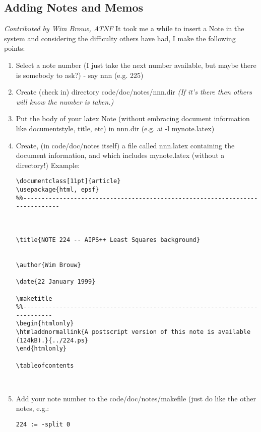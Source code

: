 \subsection{Adding Notes and Memos}\label{215:addnotes}
\textit{Contributed by Wim Brouw, ATNF}\newline
It took me a while to insert a Note in the system and considering the
difficulty others have had, I make the following points:

\begin{enumerate}
\item Select a note number (I just take the next number available, but maybe
   there is somebody to ask?) - say nnn (e.g. 225)
\item Create (check in) directory code/doc/notes/nnn.dir
\textit{(If it's there then others will know the number is taken.)}
\item Put the body of your latex Note (without embracing document information
   like documentstyle, title, \verb++ etc) in nnn.dir (e.g.
   ai -l mynote.latex)
\item Create, (in code/doc/notes itself) a file called nnn.latex containing the
   document information, and which includes mynote.latex (without a
   directory!)
   Example:
\begin{verbatim}
\documentclass[11pt]{article}
\usepackage{html, epsf}
%%-----------------------------------------------------------------------------



\title{NOTE 224 -- AIPS++ Least Squares background}
  

\author{Wim Brouw}

\date{22 January 1999}

\maketitle
%%---------------------------------------------------------------------------
\begin{htmlonly}
\htmladdnormallink{A postscript version of this note is available 
(124kB).}{../224.ps}
\end{htmlonly}

\tableofcontents
      


\end{verbatim}

\item Add your note number to the code/doc/notes/makefile (just do like the
   other notes, e.g.:
\begin{verbatim}
224 := -split 0
\end{verbatim}


\end{enumerate}
